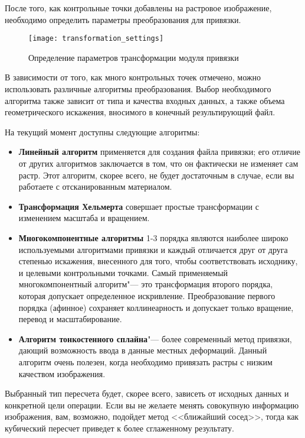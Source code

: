 После того, как контрольные точки добавлены на растровое изображение,
необходимо определить параметры преобразования для привязки.

\begin{figure}[ht]
\centering
  \texttt{[image: transformation\_settings]}
  \caption{Определение параметров трансформации модуля привязки \nixcaption}\label{fig:georef_transform}
\end{figure}


В зависимости от того, как много контрольных точек отмечено, можно
использовать различные алгоритмы преобразования. Выбор необходимого
алгоритма также зависит от типа и качества входных данных, а также
объема геометрического искажения, вносимого в конечный результирующий
файл.

На текущий момент доступны следующие алгоритмы:

\begin{itemize}[label=--]
\item \textbf{Линейный алгоритм} применяется для создания файла
привязки; его отличие от других алгоритмов заключается в том, что он
фактически не изменяет сам растр. Этот алгоритм, скорее всего, не будет
достаточным в случае, если вы работаете с отсканированным материалом.
\item \textbf{Трансформация Хельмерта} совершает простые трансформации
с изменением масштаба и вращением.
\item \textbf{Многокомпонентные алгоритмы} 1-3 порядка являются
наиболее широко используемыми алгоритмами привязки и каждый отличается
друг от друга степенью искажения, внесенного для того, чтобы
соответствовать исходнику, и целевыми контрольными точками. Самый
применяемый многокомпонентный алгоритм"--- это трансформация второго
порядка, которая допускает определенное искривление. Преобразование
первого порядка (афинное) сохраняет коллинеарность и допускает только
вращение, перевод и масштабирование.
\item \textbf{Алгоритм тонкостенного сплайна}"--- более современный
метод привязки, дающий возможность ввода в данные местных деформаций.
Данный алгоритм очень полезен, когда необходимо привязать растры с
низким качеством изображения.
\end{itemize}


Выбранный тип пересчета будет, скорее всего, зависеть от исходных данных
и конкретной цели операции. Если вы не желаете менять совокупную
информацию изображения, вам, возможно, подойдет метод <<ближайший сосед>>,
тогда как кубический пересчет приведет к более сглаженному результату.

